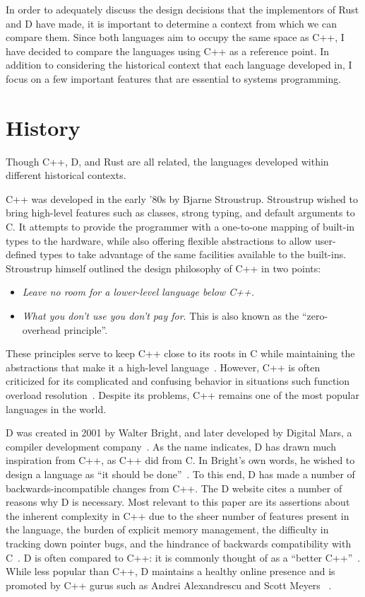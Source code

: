 \documentclass[finalcopy]{srpaper}
\begin{document}
In order to adequately discuss the design decisions that the implementors of
Rust and D have made, it is important to determine a context from which we can
compare them. Since both languages aim to occupy the same space as C++, I have
decided to compare the languages using C++ as a reference point. In addition to
considering the historical context that each language developed in, I focus on
a few important features that are essential to systems programming.

\section{History}

Though C++, D, and Rust are all related, the languages developed within
different historical contexts.

C++ was developed in the early '80s by Bjarne Stroustrup. Stroustrup wished to
bring high-level features such as classes, strong typing, and default arguments
to C. It attempts to provide the programmer with a one-to-one mapping of
built-in types to the hardware, while also offering flexible abstractions to
allow user-defined types to take advantage of the same facilities available to
the built-ins. Stroustrup himself outlined the design philosophy of C++ in two
points:

\begin{itemize}
\item \textit{Leave no room for a lower-level language below C++.}
\item \textit{What you don't use you don't pay for}. This is also known as the
``zero-overhead principle''.
\end{itemize}

These principles serve to keep C++ close to its roots in C while maintaining
the abstractions that make it a high-level language~\cite{stroustrup2013the}.
However, C++ is often criticized for its complicated and confusing behavior in
situations such function overload resolution~\cite{Dewhurst:2005:CCK:1050971}.
Despite its problems, C++ remains one of the most popular languages in the
world.

D was created in 2001 by Walter Bright, and later developed by Digital Mars, a
compiler development company~\cite{Doverview}. As the name indicates, D has
drawn much inspiration from C++, as C++ did from C. In Bright's own words, he
wished to design a language as ``it should be
done''~\cite{Alexandrescu:2010:DPL:1875434}. To this end, D has made a number
of backwards-incompatible changes from C++. The D website cites a number of
reasons why D is necessary. Most relevant to this paper are its assertions
about the inherent complexity in C++ due to the sheer number of features
present in the language, the burden of explicit memory management, the
difficulty in tracking down pointer bugs, and the hindrance of backwards
compatibility with C~\cite{Doverview}. D is often compared to C++: it is
commonly thought of as a ``better C++''~\cite{Alexandrescu:2010:DPL:1875434}.
While less popular than C++, D maintains a healthy online presence and is
promoted by C++ gurus such as Andrei
Alexandrescu and Scott Meyers ~\cite{Alexandrescu:2010:DPL:1875434}.
\end{document}
